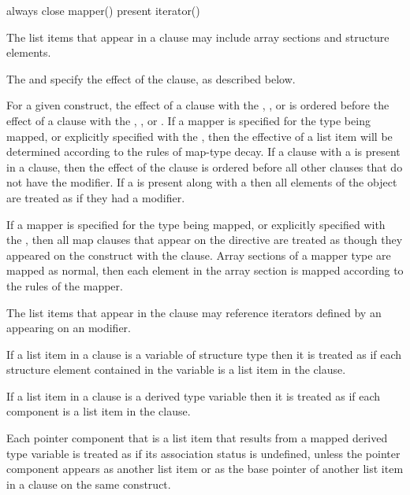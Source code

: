 \begin{indentedcodelist}
always
close
mapper()
present
iterator() 
\end{indentedcodelist}

\descr
The list items that appear in a  clause may include array sections 
and structure elements.

The  and  specify the effect of
the  clause, as described below.

For a given construct, the effect of a  clause with the ,
, or   is ordered before the effect of a
 clause with the , , or 
. If a mapper is specified for the type being mapped, or
explicitly specified with the  , then the
effective  of a list item will be determined according to the
rules of map-type decay.  If a  clause with a 
 is present in a  clause, then
the effect of the clause is ordered before all other  clauses that do not have
the  modifier.  If a  
is present along with a   then all
elements of the object are treated as if they had a  modifier.

If a mapper is specified for the type being mapped, or explicitly specified with
the  , then all map clauses that appear on the
 directive are treated as though they appeared on the
construct with the  clause.  Array sections of a mapper type are
mapped as normal, then each element in the array section is mapped according to
the rules of the mapper.

The list items that appear in the  clause may reference iterators
defined by an  appearing on an  modifier.

\begin{ccppspecific}
If a list item in a  clause is a variable of structure type then it
is treated as if each structure element contained in the variable is a list
item in the clause.
\end{ccppspecific}

\begin{fortranspecific}
If a list item in a  clause is a derived type variable then
it is treated as if each component is a list item in the clause.

Each pointer component that is a list item that results from a mapped
derived type variable is treated as if its association status is
undefined, unless the pointer component appears as another list item
or as the base pointer of another list item in a  clause on
the same construct.
\end{fortranspecific}

